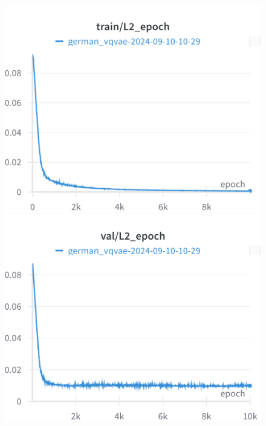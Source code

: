 \begin{figure}[H]
\includegraphics[width=\linewidth]{detailed_engineering/German VQVAE/charts/train_l2.png}
\caption{}
\endminipage\hfill
{}
\includegraphics[width=\linewidth]{detailed_engineering/German VQVAE/charts/val_l2.png}
\caption{}
\endminipage
\end{figure}

